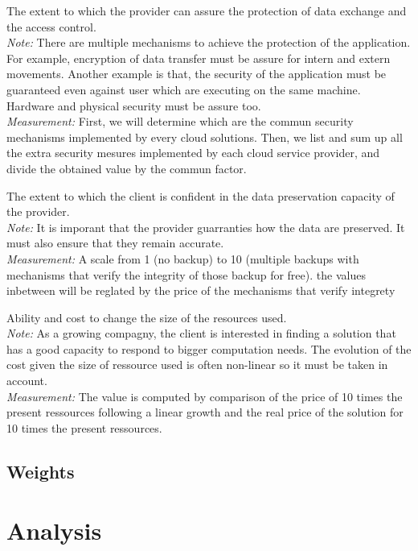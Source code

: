 \documentclass[a4paper,11pt]{article}
\begin{document}
\begin{description}[parsep=1pt,listparindent=\parindent,labelindent=\parindent,font=$\bullet$\ ]
  \item[Security:] The extent to which the provider can assure the protection of data exchange and the access control.\\
    \emph{Note:} There are multiple mechanisms to achieve the protection of the application. For example, encryption of data transfer must be assure for intern and extern movements. Another example is that, the security of the application must be guaranteed even against user which are executing on the same machine. Hardware and physical security must be assure too. \\
    \emph{Measurement:} First, we will determine which are the commun security mechanisms implemented by every cloud solutions. Then, we list and sum up all the extra security mesures implemented by each cloud service provider, and divide the obtained value by the commun factor.

  \item[Data Integrity:] The extent to which the client is confident in the data preservation capacity of the provider.\\
    \emph{Note:} It is imporant that the provider guarranties how the data are preserved. It must also ensure that they remain accurate.\\ 
    \emph{Measurement:} A scale from 1 (no backup) to 10 (multiple backups with mechanisms that verify the integrity of those backup for free). the values inbetween will be reglated by the price of the mechanisms that verify integrety

  \item[Scalability:] Ability and cost to change the size of the resources used.\\
    \emph{Note:} As a growing compagny, the client is interested in finding a solution that has a good capacity to respond to bigger computation needs. The evolution of the cost given the size of ressource used is often non-linear so it must be taken in account.\\
    \emph{Measurement:} The value is computed by comparison of the price of 10 times the present ressources following a linear growth and the real price of the solution for 10 times the present ressources.

\end{description}


\subsection{Weights}


\section{Analysis}
\end{document}
